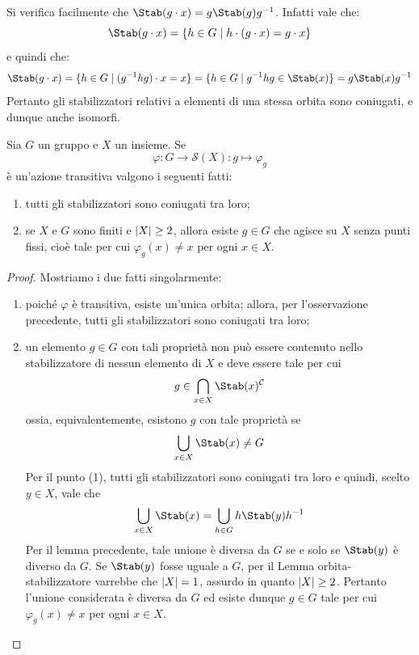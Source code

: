 \documentclass[11pt]{scrartcl}
\begin{document}
	\begin{remark}
		Si verifica facilmente che $\Stab(g \cdot x) = g \Stab(g) g\inv$. Infatti
		vale che:
		\[ \Stab(g \cdot x) = \{ h \in G \mid h \cdot (g \cdot x) = g \cdot x \} \]
		e quindi che:
		\[ \Stab(g \cdot x) = \{ h \in G \mid (g\inv h g) \cdot x = x \} = \{ h \in G \mid g\inv h g \in \Stab(x) \} = g \Stab(x) g\inv \]
		Pertanto gli stabilizzatori relativi a elementi di una stessa orbita sono
		coniugati, e dunque anche isomorfi.
	\end{remark}
	
	\begin{proposition}
		\label{prop1.41}
		Sia $G$ un gruppo e $X$ un insieme. Se 
		\[
		\varphi:G \to \mathcal{S}(X) :g \mapsto \varphi_g
		\] è un'azione transitiva valgono i seguenti fatti:
		\begin{enumerate}[(1)]
			\item tutti gli stabilizzatori sono coniugati tra loro;
			\item se $X$ e $G$ sono finiti e $\left\lvert X \right\rvert \geq 2$, allora esiste $g \in G$ che agisce su $X$ senza
			punti fissi, cioè tale per cui $\varphi_g(x) \neq x$ per ogni $x \in X$.
		\end{enumerate}
	\end{proposition}
	
	\begin{proof}
		Mostriamo i due fatti singolarmente:
		\begin{enumerate}[(1)]
			\item poiché $\varphi$ è transitiva, esiste un'unica orbita; allora,
			per l'osservazione precedente, tutti gli stabilizzatori sono coniugati tra
			loro;
			\item un elemento $g \in G$ con tali proprietà non può essere contenuto 
			nello stabilizzatore di nessun elemento di $X$ e deve essere tale
			per cui
			\[
			g \in \bigcap_{x \in X}\Stab(x)^{\mathcal{C}}
			\]
			ossia, equivalentemente, esistono $g$ con tale proprietà se
			\[
			\bigcup_{x \in X} \Stab(x) \neq G
			\]
			Per il punto (1), tutti gli stabilizzatori sono coniugati tra loro
			e quindi, scelto $y \in X$, vale che
			\[
			\bigcup_{x \in X} \Stab(x) = \bigcup_{h \in G} h \Stab(y) h\inv
			\]
			Per il lemma precedente, tale unione è diversa da $G$ se e solo se $\Stab(y)$ è diverso da $G$. Se $\Stab(y)$ fosse uguale a $G$, per il Lemma orbita-stabilizzatore
			varrebbe che $\left\lvert X \right\rvert = 1$, assurdo in quanto $\left\lvert X \right\rvert \geq 2$.
			Pertanto l'unione considerata è diversa da $G$ ed esiste dunque $g \in G$
			tale per cui $\varphi_g(x) \neq x$ per ogni $x \in X$.
		\end{enumerate}
	\end{proof}
	
\end{document}
